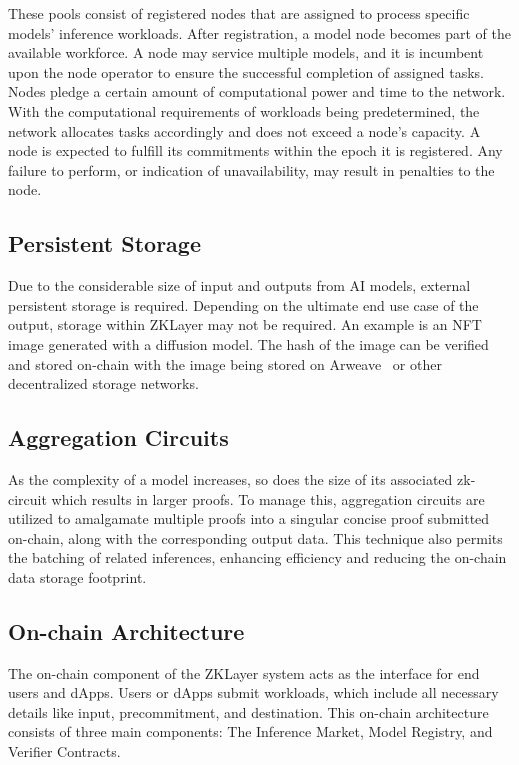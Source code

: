 \documentclass[conference]{IEEEtran}
\begin{document}
These pools consist of registered nodes that are assigned to process specific models' inference workloads. After registration, a model node becomes part of the available workforce. A node may service multiple models, and it is incumbent upon the node operator to ensure the successful completion of assigned tasks. Nodes pledge a certain amount of computational power and time to the network. With the computational requirements of workloads being predetermined, the network allocates tasks accordingly and does not exceed a node's capacity. A node is expected to fulfill its commitments within the epoch it is registered. Any failure to perform, or indication of unavailability, may result in penalties to the node.


\subsection{Persistent Storage}

Due to the considerable size of input and outputs from AI models, external persistent storage is required. Depending on the ultimate end use case of the output, storage within ZKLayer may not be required. An example is an NFT image generated with a diffusion model. The hash of the image can be verified and stored on-chain with the image being stored on Arweave~\cite{Arweave} or other decentralized storage networks.


\subsection{Aggregation Circuits}

As the complexity of a model increases, so does the size of its associated zk-circuit which results in larger proofs. To manage this, aggregation circuits are utilized to amalgamate multiple proofs into a singular concise proof submitted on-chain, along with the corresponding output data. This technique also permits the batching of related inferences, enhancing efficiency and reducing the on-chain data storage footprint.

\subsection{On-chain Architecture}

The on-chain component of the ZKLayer system acts as the interface for end users and dApps.  Users or dApps submit workloads, which include all necessary details like input, precommitment, and destination. This on-chain architecture consists of three main components: The Inference Market, Model Registry, and Verifier Contracts.
\end{document}
